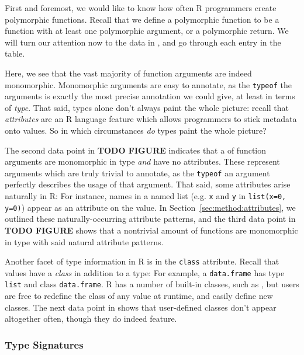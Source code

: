 First and foremost, we would like to know how often R programmers create polymorphic functions.
Recall that we define a polymorphic function to be a function with at least one polymorphic argument, or a polymorphic return.
We will turn our attention now to the data in , and go through each entry in the table.

Here, we see that the vast majority of function arguments are indeed monomorphic.
Monomorphic arguments are easy to annotate, as the {\tt typeof} the arguments is exactly the most precise annotation we could give, at least in terms of \textit{type}.
That said, types alone don't always paint the whole picture:
recall that \textit{attributes} are an R language feature which allows programmers to stick metadata onto values.
So in which circumstances \textit{do} types paint the whole picture?

The second data point in \textbf{TODO FIGURE} indicates that a  of function arguments are monomorphic in type \textit{and} have no attributes.
These represent arguments which are truly trivial to annotate, as the {\tt typeof} an argument perfectly describes the usage of that argument.
That said, some attributes arise naturally in R:
For instance, names in a named list (e.g. {\tt x} and {\tt y} in {\tt list(x=0, y=0)}) appear as an attribute on the value.
In Section~\ref{sec:method:attributes}, we outlined these naturally-occurring attribute patterns, and the third data point in \textbf{TODO FIGURE} shows that a nontrivial amount of functions are monomorphic in type with said natural attribute patterns.

Another facet of type information in R is in the {\tt class} attribute.
Recall that values have a \textit{class} in addition to a type:
For example, a {\tt data.frame} has type {\tt list} and class {\tt data.frame}.
R has a number of built-in classes, such as , but users are free to redefine the class of any value at runtime, and easily define new classes.
The next data point in  shows that user-defined classes don't appear altogether often, though they do indeed feature.


\subsubsection{Type Signatures}

